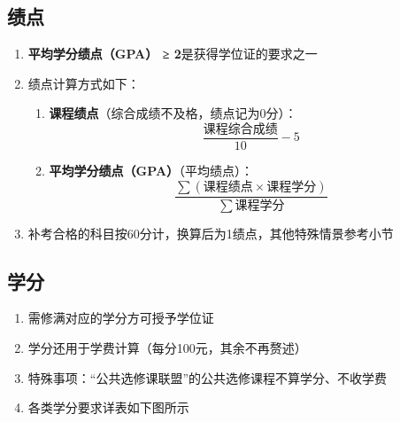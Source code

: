 \subsection[绩点]{绩点}
\label{gpa} %
\begin{enumerate}
    \item \textbf{平均学分绩点（GPA） ≥ 2}是获得学位证的要求之一
    \item 绩点计算方式如下：
          \begin{enumerate}
              \item \textbf{课程绩点}（综合成绩不及格，绩点记为0分）：
                    \begin{equation}
                        \frac{课程综合成绩}{10} - 5
                    \end{equation}
              \item \textbf{平均学分绩点（GPA）}（平均绩点）：
                    \begin{equation}
                        \frac{\sum (课程绩点 \times 课程学分)}{\sum 课程学分}
                    \end{equation}
          \end{enumerate}
    \item 补考合格的科目按60分计，换算后为1绩点，其他特殊情景参考小节
\end{enumerate}

\subsection[学分]{学分}
\begin{enumerate}
    \item 需修满对应的学分方可授予学位证
    \item 学分还用于学费计算（每分100元，其余不再赘述）
    \item 特殊事项：“公共选修课联盟”的公共选修课程不算学分、不收学费
    \item 各类学分要求详表\footnotemark 如下图所示
\end{enumerate}

